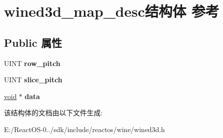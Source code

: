 \hypertarget{structwined3d__map__desc}{}\section{wined3d\+\_\+map\+\_\+desc结构体 参考}
\label{structwined3d__map__desc}
\subsection*{Public 属性}
\begin{DoxyCompactItemize}
\item 
\mbox{\label{structwined3d__map__desc_a05b6580f9bf1954481d3e00554c2509b}} 
U\+I\+NT {\bfseries row\+\_\+pitch}
\item 
\mbox{\label{structwined3d__map__desc_ac6fed243d1af1d30f3e40674e6d49359}} 
U\+I\+NT {\bfseries slice\+\_\+pitch}
\item 
\mbox{\label{structwined3d__map__desc_ac02aa4d41d6399eb22c73f453c5e2bf6}} 
\hyperlink{interfacevoid}{void} $\ast$ {\bfseries data}
\end{DoxyCompactItemize}


该结构体的文档由以下文件生成\+:\begin{DoxyCompactItemize}
\item 
E\+:/\+React\+O\+S-\/0../sdk/include/reactos/wine/wined3d.\+h\end{DoxyCompactItemize}
